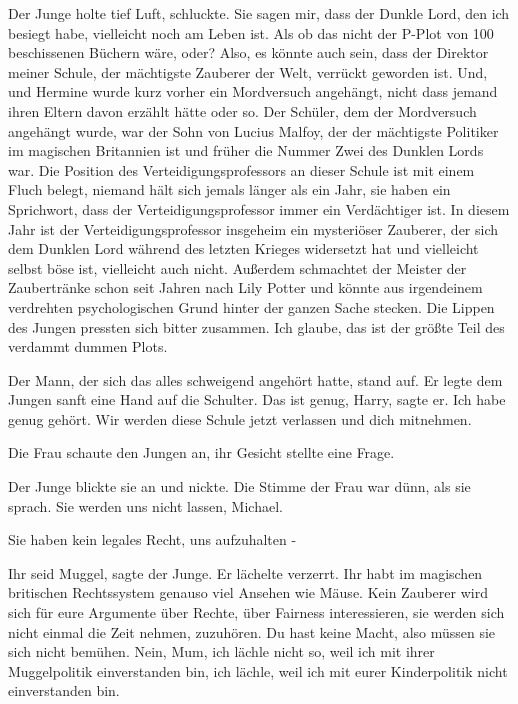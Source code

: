 Der Junge holte tief Luft, schluckte. \glqq Sie sagen mir, dass der Dunkle Lord,
den ich besiegt habe, vielleicht noch am Leben ist. Als ob das nicht der P-Plot
von 100 beschissenen Büchern wäre, oder? Also, es könnte auch sein, dass der
Direktor meiner Schule, der mächtigste Zauberer der Welt, verrückt geworden ist.
Und, und Hermine wurde kurz vorher ein Mordversuch angehängt, nicht dass jemand
ihren Eltern davon erzählt hätte oder so. Der Schüler, dem der Mordversuch
angehängt wurde, war der Sohn von Lucius Malfoy, der der mächtigste Politiker im
magischen Britannien ist und früher die Nummer Zwei des Dunklen Lords war. Die
Position des Verteidigungsprofessors an dieser Schule ist mit einem Fluch
belegt, niemand hält sich jemals länger als ein Jahr, sie haben ein Sprichwort,
dass der Verteidigungsprofessor immer ein Verdächtiger ist. In diesem Jahr ist
der Verteidigungsprofessor insgeheim ein mysteriöser Zauberer, der sich dem
Dunklen Lord während des letzten Krieges widersetzt hat und vielleicht selbst
böse ist, vielleicht auch nicht. Außerdem schmachtet der Meister der
Zaubertränke schon seit Jahren nach Lily Potter und könnte aus irgendeinem
verdrehten psychologischen Grund hinter der ganzen Sache stecken.\grqq{} Die
Lippen des Jungen pressten sich bitter zusammen. \glqq Ich glaube, das ist der
größte Teil des verdammt dummen Plots.\grqq{}

Der Mann, der sich das alles schweigend angehört hatte, stand auf. Er legte dem
Jungen sanft eine Hand auf die Schulter. \glqq Das ist genug, Harry\grqq{},
sagte er. \glqq Ich habe genug gehört. Wir werden diese Schule jetzt verlassen
und dich mitnehmen.\grqq{}

Die Frau schaute den Jungen an, ihr Gesicht stellte eine Frage.

Der Junge blickte sie an und nickte. Die Stimme der Frau war dünn, als sie
sprach. \glqq Sie werden uns nicht lassen, Michael.\grqq{}

\glqq Sie haben kein legales Recht, uns aufzuhalten -\grqq{}

\glqq Ihr seid Muggel\grqq{}, sagte der Junge. Er lächelte verzerrt. \glqq Ihr
habt im magischen britischen Rechtssystem genauso viel Ansehen wie Mäuse. Kein
Zauberer wird sich für eure Argumente über Rechte, über Fairness interessieren,
sie werden sich nicht einmal die Zeit nehmen, zuzuhören. Du hast keine Macht,
also müssen sie sich nicht bemühen. Nein, Mum, ich lächle nicht so, weil ich mit
ihrer Muggelpolitik einverstanden bin, ich lächle, weil ich mit eurer
Kinderpolitik nicht einverstanden bin.\grqq{}

